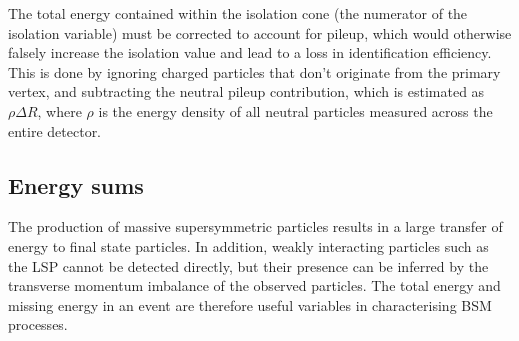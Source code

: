 The total energy contained within the isolation cone (the numerator of the 
isolation variable) must be corrected to account for pileup, which would 
otherwise falsely increase the isolation value and lead to a loss in 
identification efficiency. This is done by ignoring charged particles that 
don't originate from the primary vertex, and subtracting the neutral pileup 
contribution, which is estimated as $\rho \Delta R$, where $\rho$ is the energy 
density of all neutral particles measured across the entire detector.



\subsection{Energy sums}
\label{sec:detector-energysums}
The production of massive supersymmetric 
particles results in a large transfer of energy to final state particles. 
In addition, weakly interacting particles such as the LSP cannot be detected 
directly, but their presence can be inferred by the transverse momentum 
imbalance of the observed particles. The total energy and missing energy in an 
event are therefore useful variables in characterising BSM processes. 

